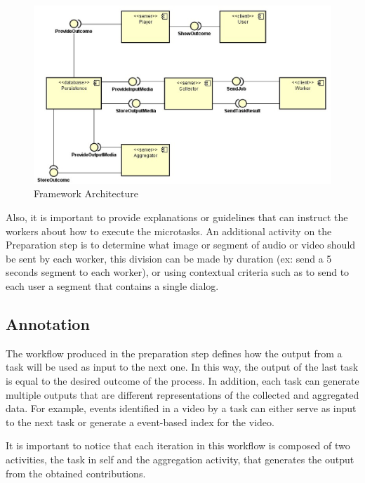 \begin{figure}[ht!]
	\centerline{\includegraphics[scale=0.5] {figure/system}}
	\caption{Framework Architecture}
	\label{architecture}
\end{figure}

Also, it is important to provide explanations or guidelines that can instruct the workers about how to execute the microtasks. An additional activity on the Preparation step is to determine what image or segment of audio or video should be sent by each worker, this division can be made by duration (ex: send a 5 seconds segment to each worker), or using contextual criteria such as to send to each user a segment that contains a single dialog.

\subsection{Annotation}
The workflow produced in the preparation step defines how the output from a task will be used as input to the next one. In this way, the output of the last task is equal to the desired outcome of the process. In addition, each task can generate multiple outputs that are different representations of the collected and aggregated data. For example, events identified in a video by a task can either serve as input to the next task or generate a event-based index for the video.

It is important to notice that each iteration in this workflow is composed of two activities, the task in self and the aggregation activity, that generates the output from the obtained contributions. 



